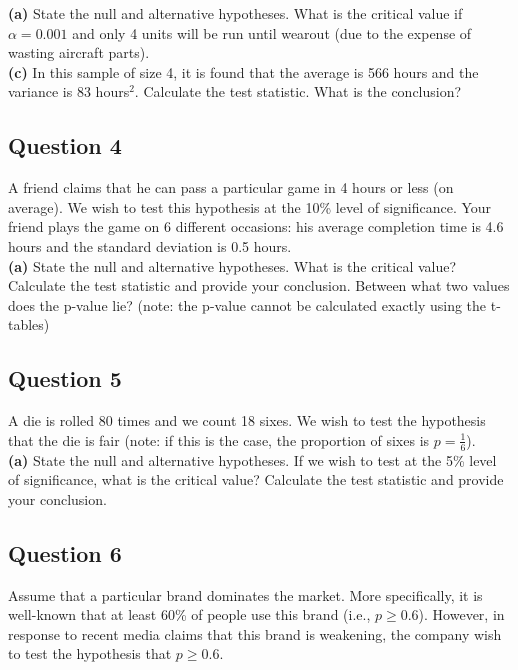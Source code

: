 \documentclass[12pt]{article}
\begin{document}
{\bf(a)} State the null and alternative hypotheses.  What is the critical value if $\alpha=0.001$ and only 4 units will be run until wearout (due to the expense of wasting aircraft parts). \quad \\ {\bf(c)} In this sample of size 4, it is found that the average is 566 hours and the variance is 83 hours$^2$. Calculate the test statistic.  What is the conclusion?



\subsection*{Question 4}
A friend claims that he can pass a particular game in 4 hours or less (on average). We wish to test this hypothesis at the 10\% level of significance. Your friend plays the game on 6 different occasions: his average completion time is 4.6 hours and the standard deviation is 0.5 hours. \\[-0.2cm]

{\bf(a)} State the null and alternative hypotheses.  What is the critical value?  Calculate the test statistic and provide your conclusion.  Between what two values does the p-value lie? (note: the p-value cannot be calculated exactly using the t-tables)



\subsection*{Question 5}
A die is rolled 80 times and we count 18 sixes. We wish to test the hypothesis that the die is fair (note: if this is the case, the proportion of sixes is $p = \frac{1}{6}$). \\[-0.2cm]

{\bf(a)} State the null and alternative hypotheses.  If we wish to test at the 5\% level of significance, what is the critical value?  Calculate the test statistic and provide your conclusion.



\subsection*{Question 6}
Assume that a particular brand dominates the market. More specifically, it is well-known that at least 60\% of people use this brand (i.e., $p \ge 0.6$). However, in response to recent media claims that this brand is weakening, the company wish to test the hypothesis that $p \ge 0.6$. \\[-0.2cm]
\end{document}
